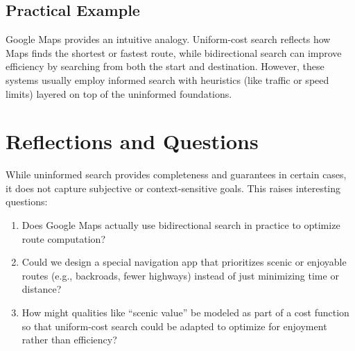 \documentclass[11pt]{article}
\begin{document}
\subsection*{Practical Example}
Google Maps provides an intuitive analogy. Uniform-cost search reflects how Maps finds the shortest or fastest route, while bidirectional search can improve efficiency by searching from both the start and destination. However, these systems usually employ informed search with heuristics (like traffic or speed limits) layered on top of the uninformed foundations.

\section*{Reflections and Questions}
While uninformed search provides completeness and guarantees in certain cases, it does not capture subjective or context-sensitive goals. This raises interesting questions:
\begin{enumerate}
  \item Does Google Maps actually use bidirectional search in practice to optimize route computation?
  \item Could we design a special navigation app that prioritizes scenic or enjoyable routes (e.g., backroads, fewer highways) instead of just minimizing time or distance?
  \item How might qualities like “scenic value” be modeled as part of a cost function so that uniform-cost search could be adapted to optimize for enjoyment rather than efficiency?
\end{enumerate}
\end{document}
